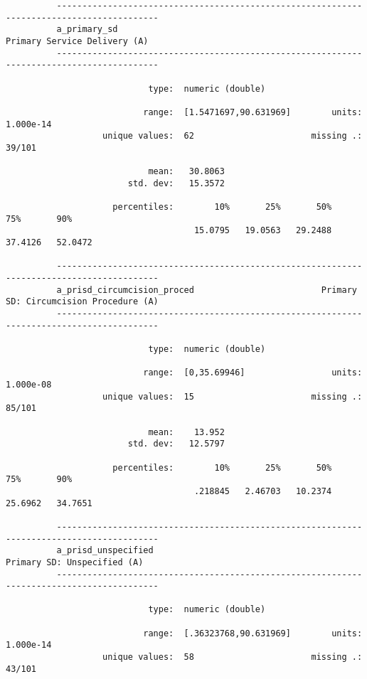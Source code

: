 \documentclass{article}
\begin{document}
\begin{verbatim}
          ------------------------------------------------------------------------------------------
          a_primary_sd                                                  Primary Service Delivery (A)
          ------------------------------------------------------------------------------------------
          
                            type:  numeric (double)
          
                           range:  [1.5471697,90.631969]        units:  1.000e-14
                   unique values:  62                       missing .:  39/101
          
                            mean:   30.8063
                        std. dev:   15.3572
          
                     percentiles:        10%       25%       50%       75%       90%
                                     15.0795   19.0563   29.2488   37.4126   52.0472
          
          ------------------------------------------------------------------------------------------
          a_prisd_circumcision_proced                         Primary SD: Circumcision Procedure (A)
          ------------------------------------------------------------------------------------------
          
                            type:  numeric (double)
          
                           range:  [0,35.69946]                 units:  1.000e-08
                   unique values:  15                       missing .:  85/101
          
                            mean:    13.952
                        std. dev:   12.5797
          
                     percentiles:        10%       25%       50%       75%       90%
                                     .218845   2.46703   10.2374   25.6962   34.7651
          
          ------------------------------------------------------------------------------------------
          a_prisd_unspecified                                            Primary SD: Unspecified (A)
          ------------------------------------------------------------------------------------------
          
                            type:  numeric (double)
          
                           range:  [.36323768,90.631969]        units:  1.000e-14
                   unique values:  58                       missing .:  43/101
          

\end{verbatim}
\end{document}

